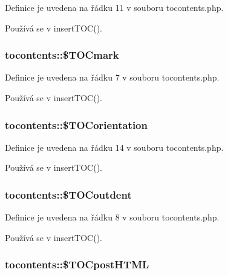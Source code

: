 Definice je uvedena na řádku 11 v souboru tocontents.\-php.



Používá se v insert\-T\-O\-C().

\hypertarget{classtocontents_a6900c91b59630da4498b7eab607418e8}{
\subsubsection[{\$\-T\-O\-Cmark}]{\setlength{\rightskip}{0pt plus 5cm}tocontents\-::\$\-T\-O\-Cmark}}\label{classtocontents_a6900c91b59630da4498b7eab607418e8}


Definice je uvedena na řádku 7 v souboru tocontents.\-php.



Používá se v insert\-T\-O\-C().

\hypertarget{classtocontents_a24c30d79aaa9a509776ae1ac072d8fa3}{
\subsubsection[{\$\-T\-O\-Corientation}]{\setlength{\rightskip}{0pt plus 5cm}tocontents\-::\$\-T\-O\-Corientation}}\label{classtocontents_a24c30d79aaa9a509776ae1ac072d8fa3}


Definice je uvedena na řádku 14 v souboru tocontents.\-php.



Používá se v insert\-T\-O\-C().

\hypertarget{classtocontents_a9ad26e5b1353a538a7ed33b2b1b2b81a}{
\subsubsection[{\$\-T\-O\-Coutdent}]{\setlength{\rightskip}{0pt plus 5cm}tocontents\-::\$\-T\-O\-Coutdent}}\label{classtocontents_a9ad26e5b1353a538a7ed33b2b1b2b81a}


Definice je uvedena na řádku 8 v souboru tocontents.\-php.



Používá se v insert\-T\-O\-C().

\hypertarget{classtocontents_a8cc007390c83ba8118f703a22873ba61}{
\subsubsection[{\$\-T\-O\-Cpost\-H\-T\-M\-L}]{\setlength{\rightskip}{0pt plus 5cm}tocontents\-::\$\-T\-O\-Cpost\-H\-T\-M\-L}}\label{classtocontents_a8cc007390c83ba8118f703a22873ba61}


